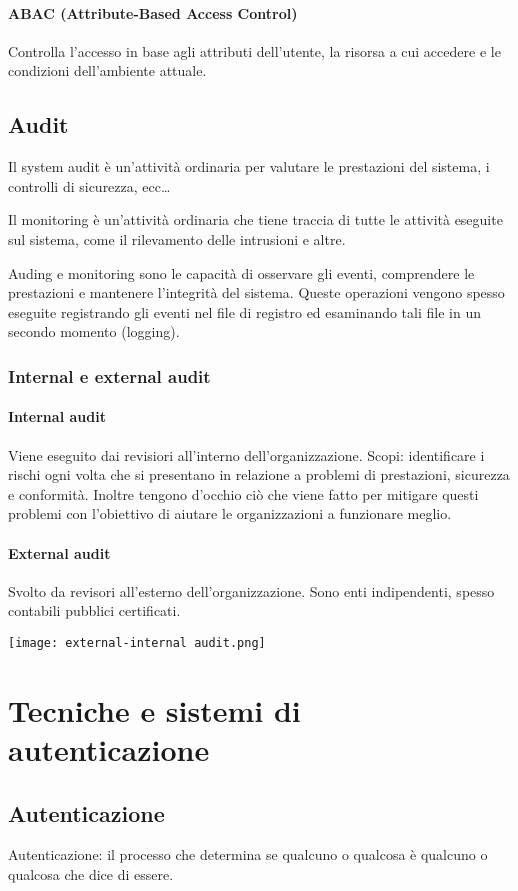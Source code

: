 \documentclass[11pt]{article}
\begin{document}
\paragraph*{ABAC (Attribute-Based Access Control)}
Controlla l'accesso in base agli attributi dell'utente, la risorsa a cui accedere e le condizioni dell'ambiente attuale.
\subsection{Audit}
Il system audit è un'attività ordinaria per valutare le prestazioni del sistema, i controlli di sicurezza, ecc\dots 

Il monitoring è un'attività ordinaria che tiene traccia di tutte le attività eseguite sul sistema, come il rilevamento delle 
intrusioni e altre.

Auding e monitoring sono le capacità di osservare gli eventi, comprendere le prestazioni e mantenere l'integrità del sistema.
Queste operazioni vengono spesso eseguite registrando gli eventi nel file di registro ed esaminando tali file in un secondo 
momento (logging).
\subsubsection{Internal e external audit}
\paragraph*{Internal audit}
Viene eseguito dai revisiori all'interno dell'organizzazione. Scopi: identificare i rischi ogni volta che si presentano 
in relazione a problemi di prestazioni, sicurezza e conformità. Inoltre tengono d'occhio ciò che viene fatto per mitigare 
questi problemi con l'obiettivo di aiutare le organizzazioni a funzionare meglio.
\paragraph*{External audit}
Svolto da revisori all'esterno dell'organizzazione. Sono enti indipendenti, spesso contabili pubblici certificati.
\begin{center}
    \texttt{[image: external-internal audit.png]}
\end{center}
\section{Tecniche e sistemi di autenticazione}
\subsection{Autenticazione}
Autenticazione: il processo che determina se qualcuno o qualcosa è qualcuno o qualcosa che dice di essere.
\end{document}
